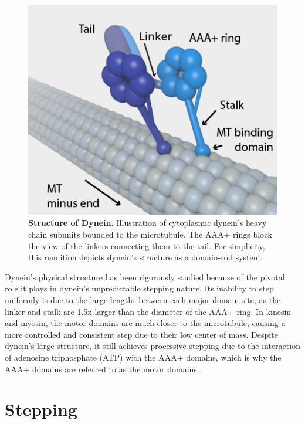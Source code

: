 
\begin{figure}[H]
	\centering
	\includegraphics[width=0.6\columnwidth]{Figures/dynein_on_MT.png}
	\caption[Structure of Dynein]{\textbf{Structure of Dynein.} Illustration of cytoplasmic dynein's heavy chain subunits bounded to the microtubule. The AAA+ rings block the view of the linkers connecting them to the tail. For simplicity, this rendition depicts dynein’s structure as a domain-rod system. \cite{TheTrappistArt}}
	\label{fig:structure}
\end{figure}

Dynein's physical structure has been rigorously studied because of the pivotal role it plays in dynein's unpredictable stepping nature. Its inability to step uniformly is due to the large lengths between each major domain site, as the linker and stalk are 1.5x larger than the diameter of the AAA+ ring. In kinesin and myosin, the motor domains are much closer to the microtubule, causing a more controlled and consistent step due to their low center of mass. Despite dynein's large structure, it still achieves processive stepping due to the interaction of adenosine triphosphate (ATP) with the AAA+ domains, which is why the AAA+ domains are referred to as the motor domains.





\section{Stepping}


